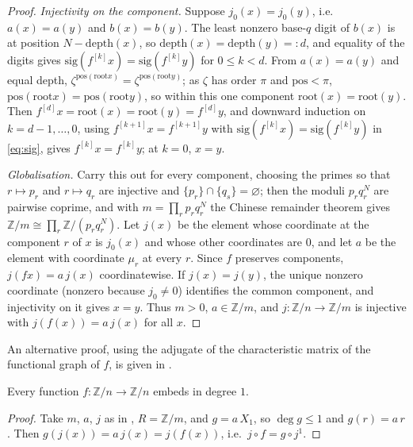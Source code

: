 \begin{proof}
\emph{Injectivity on the component.} Suppose $j_0(x) = j_0(y)$, i.e.\ $a(x) = a(y)$ and
$b(x) = b(y)$. The least nonzero base-$q$ digit of $b(x)$ is at position
$N - \mathrm{depth}(x)$, so $\mathrm{depth}(x) = \mathrm{depth}(y) =: d$, and equality of the
digits gives $\mathrm{sig}(f^{[k]}x) = \mathrm{sig}(f^{[k]}y)$ for $0 \le k < d$. From
$a(x) = a(y)$ and equal depth, $\zeta^{\mathrm{pos}(\mathrm{root} x)} =
\zeta^{\mathrm{pos}(\mathrm{root} y)}$; as $\zeta$ has order $\pi$ and $\mathrm{pos} < \pi$,
$\mathrm{pos}(\mathrm{root} x) = \mathrm{pos}(\mathrm{root} y)$, so within this one component
$\mathrm{root}(x) = \mathrm{root}(y)$. Then $f^{[d]}x = \mathrm{root}(x) = \mathrm{root}(y) =
f^{[d]}y$, and downward induction on $k = d-1,\dots,0$, using $f^{[k+1]}x = f^{[k+1]}y$ with
$\mathrm{sig}(f^{[k]}x) = \mathrm{sig}(f^{[k]}y)$ in \eqref{eq:sig}, gives $f^{[k]}x =
f^{[k]}y$; at $k = 0$, $x = y$.

\emph{Globalisation.} Carry this out for every component, choosing the primes so that
$r \mapsto p_r$ and $r \mapsto q_r$ are injective and $\{p_r\} \cap \{q_s\} = \varnothing$;
then the moduli $p_r q_r^{N}$ are pairwise coprime, and with $m = \prod_r p_r q_r^{N}$ the
Chinese remainder theorem gives $\mathbb{Z}/m \cong \prod_r \mathbb{Z}/(p_r q_r^{N})$. Let
$j(x)$ be the element whose coordinate at the component $r$ of $x$ is $j_0(x)$ and whose other
coordinates are $0$, and let $a$ be the element with coordinate $\mu_r$ at every $r$. Since $f$
preserves components, $j(f x) = a\, j(x)$ coordinatewise. If $j(x) = j(y)$, the unique nonzero
coordinate (nonzero because $j_0 \ne 0$) identifies the common component, and injectivity on
it gives $x = y$. Thus $m > 0$, $a \in \mathbb{Z}/m$, and $j \colon \mathbb{Z}/n \to
\mathbb{Z}/m$ is injective with $j(f(x)) = a\, j(x)$ for all $x$.
\end{proof}

An alternative proof, using the adjugate of the characteristic matrix of the functional
graph of $f$, is given in \cite{bacik2025linear}.

\begin{theorem}\label{thm:unary}
\leanok{}
Every function $f \colon \mathbb{Z}/n \to \mathbb{Z}/n$ embeds in degree $1$.
\end{theorem}

\begin{proof}\leanok{}
Take $m$, $a$, $j$ as in , $R = \mathbb{Z}/m$, and $g = a\,X_1$, so
$\deg g \le 1$ and $g(r) = a\,r$. Then $g(j(x)) = a\,j(x) = j(f(x))$, i.e.\
$j \circ f = g \circ j^1$.
\end{proof}

